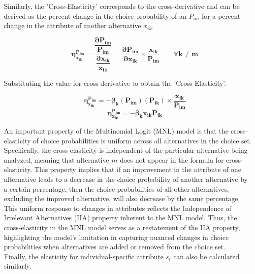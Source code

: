 \documentclass[a4paper,11pt]{article}
\begin{document}
    Similarly, the 'Cross-Elasticity' corresponds to the cross-derivative and can be derived as the percent change in the choice probability of an $P_{im}$ for a percent change in the attribute of another alternative $x_{ik}$.

    \begin{equation*}
        \qquad \mathbf{\eta_{x_{ik}}^{P_{im}} = \dfrac{\dfrac{\partial P_{im}}{P_{im}}}{\dfrac{\partial x_{ik}}{x_{ik}}} = \dfrac{\partial P_{im}}{\partial x_{ik}} \times \dfrac{x_{ik}}{P_{im}} \qquad \forall k \neq m} 
    \end{equation*}

    Substituting the value for cross-derivative to obtain the 'Cross-Elasticity'.

    \begin{equation*}
        \qquad \mathbf{\eta_{x_{ik}}^{P_{im}} = - \beta_{k}(P_{im})(P_{ik}) \times \dfrac{x_{ik}}{P_{im}}}
    \end{equation*}
    \begin{equation*}
        \qquad \mathbf{\eta_{x_{ik}}^{P_{im}} = - \beta_{k}x_{ik}P_{ik}}
    \end{equation*}

    An important property of the Multinomial Logit (MNL) model is that the cross-elasticity of choice probabilities is uniform across all alternatives in the choice set. Specifically, the cross-elasticity is independent of the particular alternative being analyzed, meaning that alternative $m$ does not appear in the formula for cross-elasticity. This property implies that if an improvement in the attribute of one alternative leads to a decrease in the choice probability of another alternative by a certain percentage, then the choice probabilities of all other alternatives, excluding the improved alternative, will also decrease by the same percentage. This uniform response to changes in attributes reflects the Independence of Irrelevant Alternatives (IIA) property inherent to the MNL model. Thus, the cross-elasticity in the MNL model serves as a restatement of the IIA property, highlighting the model's limitation in capturing nuanced changes in choice probabilities when alternatives are added or removed from the choice set.\\

    Finally, the elasticity for individual-specific attribute $s_{i}$ can also be calculated similarly.
\end{document}
